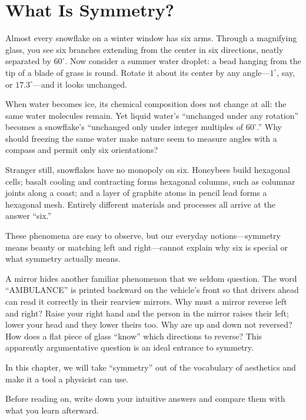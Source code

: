 \chapter{What Is Symmetry?}


Almost every snowflake on a winter window has six arms. Through a magnifying glass, you see six branches extending from the center in six directions, neatly separated by \(60^\circ\). Now consider a summer water droplet: a bead hanging from the tip of a blade of grass is round. Rotate it about its center by any angle---\(1^\circ\), say, or \(17.3^\circ\)---and it looks unchanged.

When water becomes ice, its chemical composition does not change at all: the same water molecules remain. Yet liquid water's ``unchanged under any rotation'' becomes a snowflake's ``unchanged only under integer multiples of \(60^\circ\).'' Why should freezing the same water make nature seem to measure angles with a compass and permit only six orientations?

Stranger still, snowflakes have no monopoly on six. Honeybees build hexagonal cells; basalt cooling and contracting forms hexagonal columns, such as columnar joints along a coast; and a layer of graphite atoms in pencil lead forms a hexagonal mesh. Entirely different materials and processes all arrive at the answer ``six.''

These phenomena are easy to observe, but our everyday notions---symmetry means beauty or matching left and right---cannot explain why six is special or what symmetry actually means.

A mirror hides another familiar phenomenon that we seldom question. The word ``AMBULANCE'' is printed backward on the vehicle's front so that drivers ahead can read it correctly in their rearview mirrors. Why must a mirror reverse left and right? Raise your right hand and the person in the mirror raises their left; lower your head and they lower theirs too. Why are up and down not reversed? How does a flat piece of glass ``know'' which directions to reverse? This apparently argumentative question is an ideal entrance to symmetry.

In this chapter, we will take ``symmetry'' out of the vocabulary of aesthetics and make it a tool a physicist can use.


Before reading on, write down your intuitive answers and compare them with what you learn afterward.

